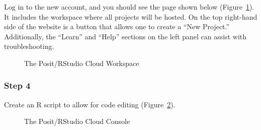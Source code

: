\documentclass[
  letterpaper,
  DIV=11,
  numbers=noendperiod]{scrreprt}
\begin{document}
Log in to the new account, and you should see the page shown below
(Figure~\ref{fig-r-cloud-3}). It includes the workspace where all
projects will be hosted. On the top right-hand side of the website is a
button that allows one to create a ``New Project.'' Additionally, the
``Learn'' and ``Help'' sections on the left panel can assist with
troubleshooting.

\begin{figure}


\caption{\label{fig-r-cloud-3}The Posit/RStudio Cloud Workspace}

\end{figure}%

\subsubsection{Step 4}\label{step-4-1}

Create an R script to allow for code editing
(Figure~\ref{fig-r-cloud-console-1}).

\begin{figure}


\caption{\label{fig-r-cloud-console-1}The Posit/RStudio Cloud Console}

\end{figure}%
\end{document}
